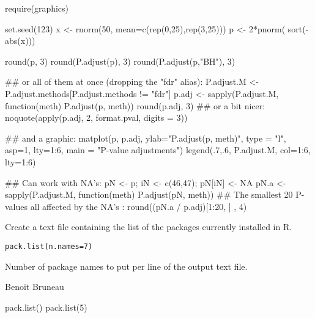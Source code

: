 \documentclass[a4paper]{book}
\begin{document}
\begin{Examples}
\begin{ExampleCode}
require(graphics)

set.seed(123)
x <- rnorm(50, mean=c(rep(0,25),rep(3,25)))
p <- 2*pnorm( sort(-abs(x)))

round(p, 3)
round(P.adjust(p), 3)
round(P.adjust(p,"BH"), 3)

## or all of them at once (dropping the "fdr" alias):
P.adjust.M <- P.adjust.methods[P.adjust.methods != "fdr"]
p.adj <- sapply(P.adjust.M, function(meth) P.adjust(p, meth))
round(p.adj, 3)
## or a bit nicer:
noquote(apply(p.adj, 2, format.pval, digits = 3))

## and a graphic:
matplot(p, p.adj, ylab="P.adjust(p, meth)", type = "l", asp=1, lty=1:6,
        main = "P-value adjustments")
legend(.7,.6, P.adjust.M, col=1:6, lty=1:6)

## Can work with NA's:
pN <- p; iN <- c(46,47); pN[iN] <- NA
pN.a <- sapply(P.adjust.M, function(meth) P.adjust(pN, meth))
## The smallest 20 P-values all affected by the NA's :
round((pN.a / p.adj)[1:20, ] , 4)
\end{ExampleCode}
\end{Examples}
\newpage
{}
%
\begin{Description}\relax
Create a text file containing the list of the packages currently installed in R.
\end{Description}
%
\begin{Usage}
\begin{verbatim}
pack.list(n.names=7)
\end{verbatim}
\end{Usage}
%
\begin{Arguments}
\begin{ldescription}
\item[\code{n.names}] 
Number of package names to put per line of the output text file.

\end{ldescription}
\end{Arguments}
%
\begin{Author}\relax
Benoit Bruneau
\end{Author}
%
\begin{Examples}
\begin{ExampleCode}
pack.list()
pack.list(5)
\end{ExampleCode}
\end{Examples}
\newpage
{}
\end{document}
